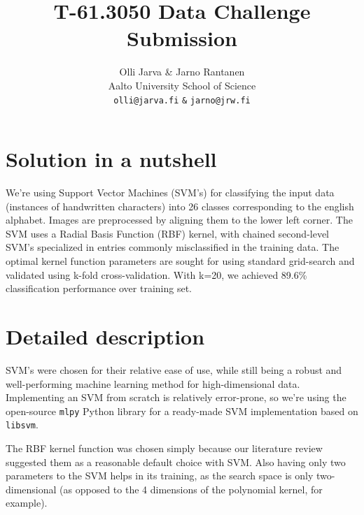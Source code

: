 \documentclass{netsec2012}
\begin{document}

\title{T-61.3050 Data Challenge Submission}

\author{Olli Jarva \& Jarno Rantanen \\
        Aalto University School of Science \\
	\texttt{olli@jarva.fi} \texttt{\&} \texttt{jarno@jrw.fi}}
\maketitle


\section{Solution in a nutshell}

We're using Support Vector Machines (SVM's) for classifying the input data (instances of 
handwritten characters) into 26 classes corresponding to the english alphabet. Images are 
preprocessed by aligning them to the lower left corner. The SVM uses a Radial Basis Function 
(RBF) kernel, with chained second-level SVM's specialized in entries commonly misclassified in 
the training data. The optimal kernel function parameters are sought for using standard 
grid-search and validated using k-fold cross-validation. With k=20, we achieved 89.6\% 
classification performance over training set.

\section{Detailed description}

SVM's were chosen for their relative ease of use, while still being a robust and well-performing 
machine learning method for high-dimensional data.  Implementing an SVM from scratch is 
relatively error-prone, so we're using the open-source \texttt{mlpy} Python library for a 
ready-made SVM implementation based on \texttt{libsvm}.


The RBF kernel function was chosen simply because our literature review suggested them as a reasonable
default choice with SVM.  Also having only two parameters to the SVM helps in its training,
as the search space is only two-dimensional (as opposed to the 4 dimensions of the polynomial kernel,
for example).
\end{document}
